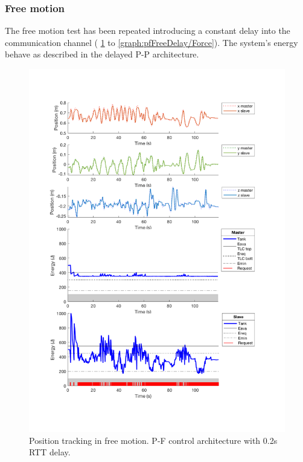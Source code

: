 \subsubsection{Free motion}
The free motion test has been repeated introducing a constant delay into the communication channel
(\figurename{ \ref{graph:pfFreeDelay/Position} to \ref{graph:pfFreeDelay/Force}}).
The system's  energy behave as described in the delayed P-P architecture.
\begin{center}
	\begin{figure}
		\includegraphics[width=\textwidth, keepaspectratio]{plots/pfFreeDelay/Position.pdf}
		\caption{Position tracking in free motion. P-F control architecture with 0.2s RTT delay.}
		\label{graph:pfFreeDelay/Position}
	\end{figure}
\end{center}
